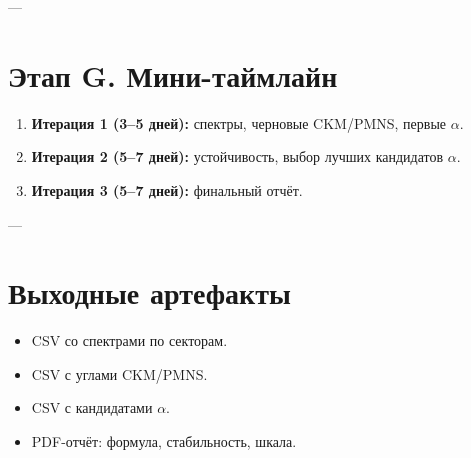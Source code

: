 \documentclass[a4paper,12pt]{article}
\begin{document}
---

\section*{Этап G. Мини-таймлайн}
\begin{enumerate}
  \item \textbf{Итерация 1 (3--5 дней):} спектры, черновые CKM/PMNS, первые $\alpha$.
  \item \textbf{Итерация 2 (5--7 дней):} устойчивость, выбор лучших кандидатов $\alpha$.
  \item \textbf{Итерация 3 (5--7 дней):} финальный отчёт.
\end{enumerate}

---

\section*{Выходные артефакты}
\begin{itemize}
  \item CSV со спектрами по секторам.
  \item CSV с углами CKM/PMNS.
  \item CSV с кандидатами $\alpha$.
  \item PDF-отчёт: формула, стабильность, шкала.
\end{itemize}
\end{document}
